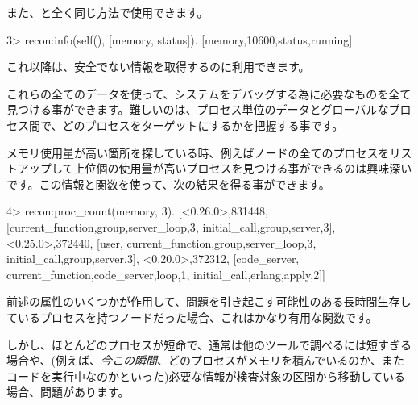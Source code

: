 また、と全く同じ方法で使用できます。

\begin{VerbatimEshell}
3> recon:info(self(), [memory, status]).
[{memory,10600},{status,running}]
\end{VerbatimEshell}

これ以降は、安全でない情報を取得するのに利用できます。

これらの全てのデータを使って、システムをデバッグする為に必要なものを全て見つける事ができます。難しいのは、プロセス単位のデータとグローバルなプロセス間で、どのプロセスをターゲットにするかを把握する事です。

メモリ使用量が高い箇所を探している時、例えばノードの全てのプロセスをリストアップして上位個の使用量が高いプロセスを見つける事ができるのは興味深いです。この情報と関数を使って、次の結果を得る事ができます。

\begin{VerbatimEshell}
4> recon:proc_count(memory, 3).
[{<0.26.0>,831448,
  [{current_function,{group,server_loop,3}},
   {initial_call,{group,server,3}}]},
 {<0.25.0>,372440,
  [user,
   {current_function,{group,server_loop,3}},
   {initial_call,{group,server,3}}]},
 {<0.20.0>,372312,
  [code_server,
   {current_function,{code_server,loop,1}},
   {initial_call,{erlang,apply,2}}]}]
\end{VerbatimEshell}

前述の属性のいくつかが作用して、問題を引き起こす可能性のある長時間生存しているプロセスを持つノードだった場合、これはかなり有用な関数です。

しかし、ほとんどのプロセスが短命で、通常は他のツールで調べるには短すぎる場合や、(例えば、\emph{今この瞬間}、どのプロセスがメモリを積んでいるのか、またコードを実行中なのかといった)必要な情報が検査対象の区間から移動している場合、問題があります。

